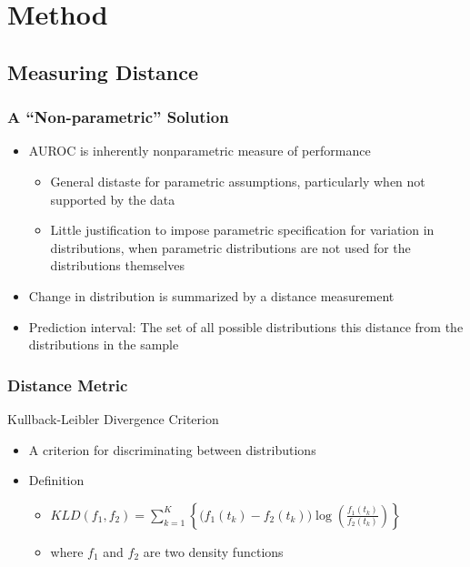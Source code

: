 \documentclass{beamer}
\begin{document}
\section{Method}
\subsection{Measuring Distance}



\begin{frame}
\frametitle{A ``Non-parametric'' Solution}


\begin{itemize}
    \item AUROC is inherently nonparametric measure of performance
    \begin{itemize}
        \item General distaste for parametric assumptions, particularly when not supported by the data
        \item Little justification to impose parametric specification for variation in distributions, when parametric distributions are not used for the distributions themselves
    \end{itemize}
    \item Change in distribution is summarized by a distance measurement
    \item Prediction interval: The set of all possible distributions this distance from the distributions in the sample
\end{itemize}

\end{frame}


\begin{frame}
\frametitle{Distance Metric}

Kullback-Leibler Divergence Criterion
\begin{itemize}
\item A criterion for discriminating between distributions
    \item Definition
    \begin{itemize}
        \item $KLD(f_1, f_2) = \sum_{k = 1}^{K} \left\{ \bigg( f_1(t_k) - f_2(t_k) \bigg)
        \log \left( \frac{f_1(t_k)}{f_2(t_k)} \right) \right\}$
        \item where $f_1$ and $f_2$ are two density functions
    \end{itemize}
\end{itemize}

\end{frame}
\end{document}
